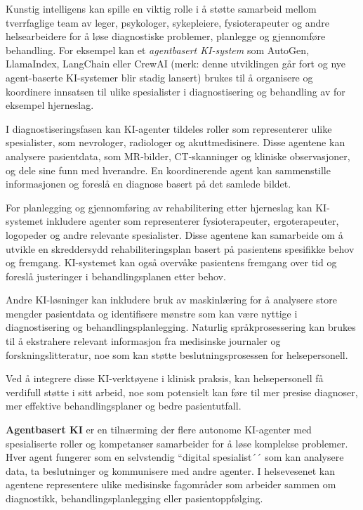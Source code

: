 

Kunstig intelligens kan spille en viktig rolle i å støtte samarbeid mellom tverrfaglige team av leger, psykologer, sykepleiere, fysioterapeuter og andre helsearbeidere for å løse diagnostiske problemer, planlegge og gjennomføre behandling. For eksempel kan et \textit{agentbasert KI-system} som AutoGen, LlamaIndex, LangChain eller CrewAI (merk: denne utviklingen går fort og nye agent-baserte KI-systemer blir stadig lansert)  brukes til å organisere og koordinere innsatsen til ulike spesialister i diagnostisering og behandling av for eksempel hjerneslag.

I diagnostiseringsfasen kan KI-agenter tildeles roller som representerer ulike spesialister, som nevrologer, radiologer og akuttmedisinere. Disse agentene kan analysere pasientdata, som MR-bilder, CT-skanninger og kliniske observasjoner, og dele sine funn med hverandre. En koordinerende agent kan sammenstille informasjonen og foreslå en diagnose basert på det samlede bildet.

For planlegging og gjennomføring av rehabilitering etter hjerneslag kan KI-systemet inkludere agenter som representerer fysioterapeuter, ergoterapeuter, logopeder og andre relevante spesialister. Disse agentene kan samarbeide om å utvikle en skreddersydd rehabiliteringsplan basert på pasientens spesifikke behov og fremgang. KI-systemet kan også overvåke pasientens fremgang over tid og foreslå justeringer i behandlingsplanen etter behov.

Andre KI-løsninger kan inkludere bruk av maskinlæring for å analysere store mengder pasientdata og identifisere mønstre som kan være nyttige i diagnostisering og behandlingsplanlegging. Naturlig språkprosessering kan brukes til å ekstrahere relevant informasjon fra medisinske journaler og forskningslitteratur, noe som kan støtte beslutningsprosessen for helsepersonell.

Ved å integrere disse KI-verktøyene i klinisk praksis, kan helsepersonell få verdifull støtte i sitt arbeid, noe som potensielt kan føre til mer presise diagnoser, mer effektive behandlingsplaner og bedre pasientutfall.\\




\begin{definisjonsbox}
\textbf{Agentbasert KI} er en tilnærming der flere autonome KI-agenter med spesialiserte roller og kompetanser samarbeider for å løse komplekse problemer. Hver agent fungerer som en selvstendig ``digital spesialist´´ som kan analysere data, ta beslutninger og kommunisere med andre agenter. I helsevesenet kan agentene representere ulike medisinske fagområder som arbeider sammen om diagnostikk, behandlingsplanlegging eller pasientoppfølging.
\end{definisjonsbox}

